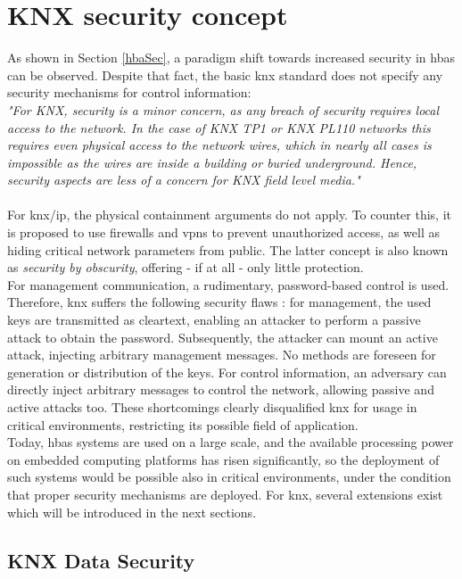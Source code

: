 \section{KNX security concept}
As shown in Section \ref{hbaSec}, a paradigm shift towards increased security in \gls{hbas} can be observed. 
Despite that fact, the basic \gls{knx} standard does not specify any security mechanisms for control information:
\\

\textit{"For KNX, security is a minor concern, as any breach of security requires local access to the network. 
In the case of KNX TP1 or KNX PL110 networks this requires even physical access to the network wires,
which in nearly all cases is impossible as the wires are inside a building or buried underground.
Hence, security aspects are less of a concern for KNX field level media."} \cite{knxSpec}
\\
\\
For \gls{knx}/\gls{ip}, the physical containment arguments do not apply. To counter this, it is proposed to use firewalls and \glspl{vpn} to prevent unauthorized access,
as well as hiding critical network parameters from public. The latter concept is also known as \textit{security by obscurity}, offering - if at all - only 
little protection.
\\
For management communication, a rudimentary, password-based control is used. Therefore, \gls{knx} suffers the following security flaws 
\cite{Granzer05securityin}: for management, the 
used keys are transmitted as cleartext, enabling an attacker to perform a passive attack to obtain the password. Subsequently, the attacker can mount an active
attack, injecting
arbitrary management messages. No methods are foreseen for generation or distribution of the keys.
For control information, an adversary can directly inject arbitrary messages to control the network, allowing passive and active attacks too.
These shortcomings clearly disqualified \gls{knx} for usage in critical environments, restricting its possible field of application.
\\
Today, \gls{hbas} systems are used on a large scale, and the available processing power on embedded computing platforms has risen significantly, so the deployment
of such systems would be possible also in critical environments, under the condition that proper security mechanisms are deployed. For \gls{knx}, several extensions
exist which will be introduced in the next sections.

\subsection{KNX Data Security}


